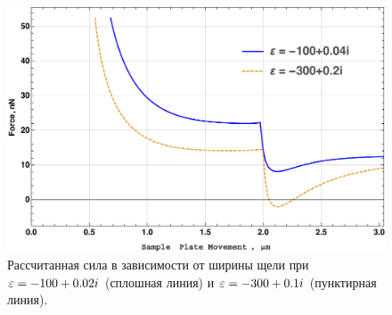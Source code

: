 \begin{figure}
    \centering
    \includegraphics[width=\textwidth]{figures/ForceGauss_Newton_100_004_300_02.pdf}
    \caption{Рассчитанная сила в зависимости от ширины щели при  $\varepsilon=-100+0.02i$ (сплошная линия) и $\varepsilon = -300 + 0.1i$ (пунктирная линия).}
    \label{fig:force_N_2eps_2}
\end{figure}


